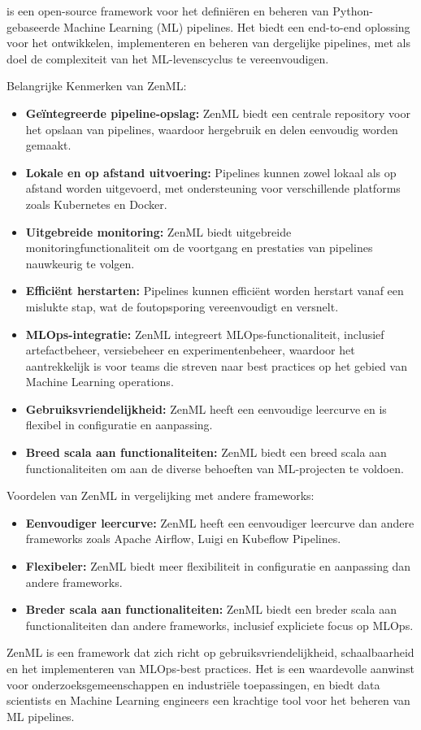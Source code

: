 \textcite{ZenML2024} is een open-source framework voor het definiëren en beheren van Python-gebaseerde Machine Learning (ML) pipelines. Het biedt een end-to-end oplossing voor het ontwikkelen, implementeren en beheren van dergelijke pipelines, met als doel de complexiteit van het ML-levenscyclus te vereenvoudigen.

Belangrijke Kenmerken van ZenML:
\begin{itemize}
    \item \textbf{Geïntegreerde pipeline-opslag:} ZenML biedt een centrale repository voor het opslaan van pipelines, waardoor hergebruik en delen eenvoudig worden gemaakt.
    \item \textbf{Lokale en op afstand uitvoering:} Pipelines kunnen zowel lokaal als op afstand worden uitgevoerd, met ondersteuning voor verschillende platforms zoals Kubernetes en Docker.
    \item \textbf{Uitgebreide monitoring:} ZenML biedt uitgebreide monitoringfunctionaliteit om de voortgang en prestaties van pipelines nauwkeurig te volgen.
    \item \textbf{Efficiënt herstarten:} Pipelines kunnen efficiënt worden herstart vanaf een mislukte stap, wat de foutopsporing vereenvoudigt en versnelt.
    \item \textbf{MLOps-integratie:} ZenML integreert MLOps-functionaliteit, inclusief artefactbeheer, versiebeheer en experimentenbeheer, waardoor het aantrekkelijk is voor teams die streven naar best practices op het gebied van Machine Learning operations.
    \item \textbf{Gebruiksvriendelijkheid:} ZenML heeft een eenvoudige leercurve en is flexibel in configuratie en aanpassing.
    \item \textbf{Breed scala aan functionaliteiten:} ZenML biedt een breed scala aan functionaliteiten om aan de diverse behoeften van ML-projecten te voldoen.
\end{itemize}

Voordelen van ZenML in vergelijking met andere frameworks:
\begin{itemize}
    \item \textbf{Eenvoudiger leercurve:} ZenML heeft een eenvoudiger leercurve dan andere frameworks zoals Apache Airflow, Luigi en Kubeflow Pipelines.
    \item \textbf{Flexibeler:} ZenML biedt meer flexibiliteit in configuratie en aanpassing dan andere frameworks.
    \item \textbf{Breder scala aan functionaliteiten:} ZenML biedt een breder scala aan functionaliteiten dan andere frameworks, inclusief expliciete focus op MLOps.
\end{itemize}
ZenML is een framework dat zich richt op gebruiksvriendelijkheid, schaalbaarheid en het implementeren van MLOps-best practices. Het is een waardevolle aanwinst voor onderzoeksgemeenschappen en industriële toepassingen, en biedt data scientists en Machine Learning engineers een krachtige tool voor het beheren van ML pipelines.

